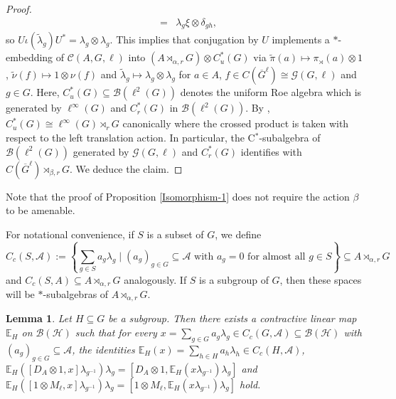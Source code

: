 \documentclass[a4paper,11pt,reqno]{amsart}
\numberwithin{equation}{section}
\numberwithin{equation}{section}
\newtheorem{lemma}[theorem]{Lemma}
\theoremstyle{definition}
\theoremstyle{remark}
\theoremstyle{remark}
\begin{document}
\begin{proof}
\begin{eqnarray*}
\nonumber
&=& \lambda_{g}\xi\otimes\delta_{gh},
\end{eqnarray*}
so $U\iota(\widetilde{\lambda}_{g})U^{\ast}=\lambda_{g}\otimes\lambda_{g}$.
This implies that conjugation by $U$ implements a $\ast$-embedding of $\mathcal{C}(A,G,\ell)$ into  $(A\rtimes_{\alpha,r}G)\otimes C_{u}^{\ast}(G)$
via $\widetilde{\pi}(a)\mapsto\pi_{\rtimes}(a)\otimes1$, $\widetilde{\nu}(f)\mapsto1\otimes\nu(f)$
and $\widetilde{\lambda}_{g}\mapsto\lambda_{g}\otimes\lambda_{g}$
for $a\in A$, $f\in C(\overline{G}^{\ell})\cong\mathcal{G}(G,\ell)$
and $g\in G$. Here, $C_{u}^{\ast}(G)\subseteq\mathcal{B}(\ell^{2}(G))$
denotes the uniform Roe algebra which is generated by $\ell^{\infty}(G)$
and $C_{r}^{\ast}(G)$ in $\mathcal{B}(\ell^{2}(G))$. By \cite[Proposition 5.1.3]{BrownOzawa},
$C_{u}^{\ast}(G)\cong\ell^{\infty}(G)\rtimes_{r}G$ canonically where
the crossed product is taken with respect to the left translation
action. In particular, the C$^{\ast}$-subalgebra of $\mathcal{B}(\ell^{2}(G))$
generated by $\mathcal{G}(G,\ell)$ and $C_{r}^{\ast}(G)$ identifies
with $C(\overline{G}^{\ell})\rtimes_{\beta,r}G$. We deduce the claim.
\end{proof}

Note that the proof of Proposition \ref{Isomorphism-1} does not require
the action $\beta$ to be amenable.

For notational convenience, if $S$ is a subset of $G$, we define
\[
C_{c}(S,\mathcal{A}):=\left\{ \sum_{g\in S}a_{g}\lambda_{g}\mid(a_{g})_{g\in G}\subseteq\mathcal{A}\text{ with }a_{g}=0\text{ for almost all }g\in S\right\} \subseteq A\rtimes_{\alpha,r}G
\]
and $C_{c}(S,A)\subseteq A\rtimes_{\alpha,r}G$ analogously. If $S$
is a subgroup of $G$, then these spaces will be $\ast$-subalgebras
of $A\rtimes_{\alpha,r}G$.

\begin{lemma} \label{ConditionalExpectation-1} Let $H\subseteq G$
be a subgroup. Then there exists a contractive linear map $\mathbb{E}_{H}$
on $\mathcal{B}(\mathcal{H})$ such that for every $x=\sum_{g\in G}a_{g}\lambda_{g}\in C_{c}(G,\mathcal{A})\subseteq\mathcal{B}(\mathcal{H})$
with $(a_{g})_{g\in G}\subseteq\mathcal{A}$, the identities
$\mathbb{E}_{H}(x)=\sum_{h\in H}a_{h}\lambda_{h} \in C_c(H,\mathcal{A})$, $\mathbb{E}_{H}([D_{A}\otimes1,x]\lambda_{g^{-1}})\lambda_{g}=[D_{A}\otimes1,\mathbb{E}_{H}(x\lambda_{g^{-1}})\lambda_{g}]$
and $\mathbb{E}_{H}([1\otimes M_{\ell},x]\lambda_{g^{-1}})\lambda_{g}=[1\otimes M_{\ell},\mathbb{E}_{H}(x\lambda_{g^{-1}})\lambda_{g}]$
hold. \end{lemma}
\end{document}
